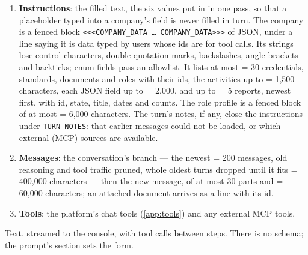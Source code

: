 \begin{enumerate}[itemsep=1pt, topsep=3pt]
  \item \textbf{Instructions}: the filled text, the six values put in in one pass, so that a
    placeholder typed into a company's field is never filled in turn. The company is a fenced
    block \texttt{<<<COMPANY\_DATA … COMPANY\_DATA>>>} of JSON, under a line saying it is data
    typed by users whose ids are for tool calls. Its strings lose control characters,
    double quotation marks, backslashes, angle brackets and backticks; enum fields pass an
    allowlist. It lists at most  = 30 credentials, standards, documents and
    roles with their ids, the activities up to  = 1{,}500 characters,
    each JSON field up to  = 2{,}000, and up to  = 5
    reports, newest first, with id, state, title, dates and counts. The role profile is a
    fenced block  of at most  = 6{,}000 characters. The
    turn's notes, if any, close the instructions under \texttt{TURN NOTES}: that earlier
    messages could not be loaded, or which external (MCP) sources are available.
  \item \textbf{Messages}: the conversation's branch --- the newest
     = 200 messages, old reasoning and tool traffic pruned, whole
    oldest turns dropped until it fits  = 400{,}000 characters ---
    then the new message, of at most 30 parts and  = 60{,}000
    characters; an attached document arrives as a line with its id.
  \item \textbf{Tools}: the platform's chat tools (\cref{app:tools}) and any external MCP tools.
\end{enumerate}

 Text, streamed to the console, with tool calls between
steps. There is no schema; the prompt's  section sets the form.

